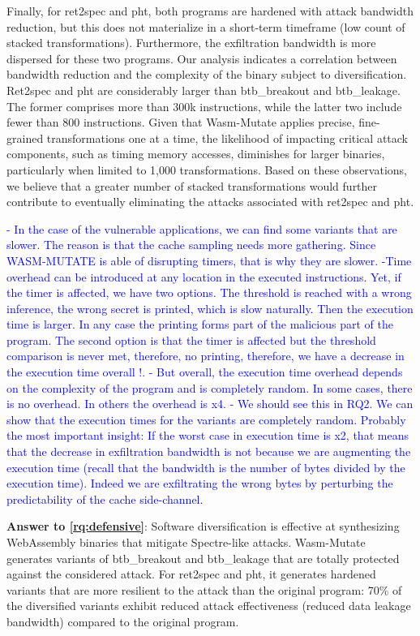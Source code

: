 \documentclass[a4paper,fleqn]{cas-dc}
\newcommand{\tool}{{\sc Wasm-Mutate}\xspace}
\newcommand{\Wasm}{WebAssembly\xspace}
\newcommand{\wasm}{\Wasm}
\newcommand{\revision}[1]{\textcolor{blue}{#1}}
\begin{document}
Finally, for ret2spec and pht, both programs are hardened with attack bandwidth reduction, but this does not materialize in a short-term timeframe (low count of stacked transformations).
Furthermore,  the exfiltration bandwidth is more dispersed for these two programs.
Our analysis indicates a correlation between bandwidth reduction and the complexity of the binary subject to diversification.
Ret2spec and pht are considerably larger than btb\_breakout and btb\_leakage.
The former comprises more than 300k instructions, while the latter two include fewer than 800 instructions.
Given that \tool applies precise, fine-grained transformations one at a time, the likelihood of impacting critical attack components, such as timing memory accesses, diminishes for larger binaries, particularly when limited to 1,000 transformations.
Based on these observations, we believe that a greater number of stacked transformations would further contribute to eventually eliminating the attacks associated with ret2spec and pht.

\revision{
    - In the case of the vulnerable applications, we can find some variants that are slower. The reason is that the cache sampling needs more gathering. Since WASM-MUTATE is able of disrupting timers, that is why they are slower.
    -Time overhead can be introduced at any location in the executed instructions. Yet, if the timer is affected, we have two options.
    The threshold is reached with a wrong inference, the wrong secret is printed, which is slow naturally. Then the execution time is larger. In any case the printing forms part of the malicious part of the program.
    The second option is that the timer is affected but the threshold comparison is never met, therefore, no printing, therefore, we have a decrease in the execution time overall !.
    - But overall, the execution time overhead depends on the complexity of the program and is completely random. In some cases, there is no overhead. In others the overhead is x4.
    - We should see this in RQ2. We can show that the execution times for the variants are completely random. 
    Probably the most important insight: If the worst case in execution time is x2, that means that the decrease in exfiltration bandwidth is not because we are augmenting the execution time (recall that the bandwidth is the number of bytes divided by the execution time). Indeed we are exfiltrating the wrong bytes by perturbing the predictability of the cache side-channel. 
}

\begin{tcolorbox}[boxrule=1pt,arc=.3em,boxsep=-1.3mm]
  \textbf{Answer to \ref{rq:defensive}}:   Software diversification is effective at synthesizing \wasm binaries that mitigate Spectre-like attacks.  
  \tool generates variants of btb\_breakout and btb\_leakage that are totally protected against the considered attack. For ret2spec and pht, it generates hardened variants that are more resilient to the attack than the original program: 70\% of the diversified variants exhibit reduced attack effectiveness (reduced data leakage bandwidth) compared to the original program.
\end{tcolorbox}
\end{document}
